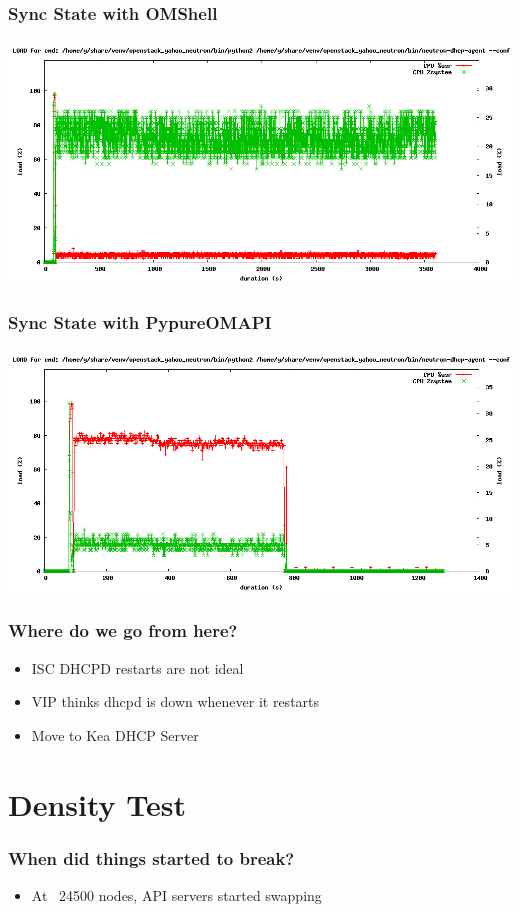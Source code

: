 \documentclass[aspectratio=169,11pt,hyperref={colorlinks=true}]{beamer}
\begin{document}
\begin{frame}
    \frametitle{Sync State with OMShell}
     \begin{center}
         \includegraphics[scale=0.35]{logos/omshell.png}
    \end{center}
\end{frame}


\begin{frame}
    \frametitle{Sync State with PypureOMAPI}
     \begin{center}
         \includegraphics[scale=0.35]{logos/pypureomapi.png}
    \end{center}
\end{frame}

\begin{frame}
    \frametitle{Where do we go from here?}
    \begin{itemize}[<+-| alert@+>]
        \item ISC DHCPD restarts are not ideal
        \item VIP thinks dhcpd is down whenever it restarts
        \item Move to Kea DHCP Server
    \end{itemize}
\end{frame}

\section{Density Test}
\begin{frame}
    \frametitle{When did things started to break?}
    \begin{itemize}
        \item At ~24500 nodes, API servers started swapping
    \end{itemize}
\end{frame}
\end{document}
